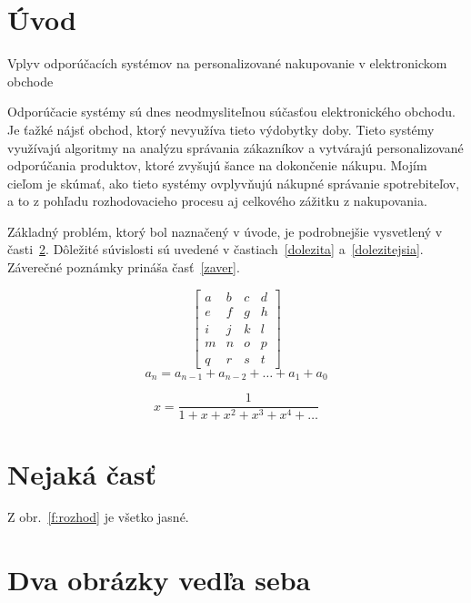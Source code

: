\documentclass[10pt,twocolumn,twoside,slovak,a4paper]{article}
\author{
\begin{minipage}[t]{0.5\textwidth}
    \vspace{-2ex} 
    \texttt{[image: fiit.png]}
\end{minipage}
\begin{minipage}[t]{0.85\textwidth}
    \vspace{-2ex}
    Roman Dunko\\[2pt]
	{\small Slovenská technická univerzita v Bratislave}\\
	{\small Fakulta informatiky a informačných technológií}\\
	{\small \texttt{xdunko@stuba.sk}}
\end{minipage}
}
\date{\small 10. október 2024}
\begin{document}
\maketitle

\begin{abstract}
\ldots
\end{abstract}

\section{Úvod}
Vplyv odporúčacích systémov na personalizované nakupovanie v elektronickom obchode

Odporúčacie systémy sú dnes neodmysliteľnou súčasťou elektronického obchodu. Je ťažké nájsť obchod, ktorý nevyužíva tieto výdobytky doby. Tieto systémy využívajú algoritmy na analýzu správania zákazníkov a vytvárajú personalizované odporúčania produktov, ktoré zvyšujú šance na dokončenie nákupu. Mojím cieľom je skúmať, ako tieto systémy ovplyvňujú nákupné správanie spotrebiteľov, a to z pohľadu rozhodovacieho procesu aj celkového zážitku z nakupovania.

Základný problém, ktorý bol naznačený v úvode, je podrobnejšie vysvetlený v časti~\ref{nejaka}.
Dôležité súvislosti sú uvedené v častiach~\ref{dolezita} a~\ref{dolezitejsia}.
Záverečné poznámky prináša časť~\ref{zaver}.

\[
\begin{bmatrix}
a & b & c & d \\
e & f & g & h \\
i & j & k & l \\
m & n & o & p \\
q & r & s & t
\end{bmatrix}
\]
\[
a_n = a_{n-1} + a_{n-2} + \dots + a_1 + a_0
\]

\[
x = \frac{1}{1+x+x^2+x^3+x^4+\dots}
\]

\section{Nejaká časť} \label{nejaka}

Z obr.~\ref{f:rozhod} je všetko jasné. 



\section{Dva obrázky vedľa seba}
\end{document}
